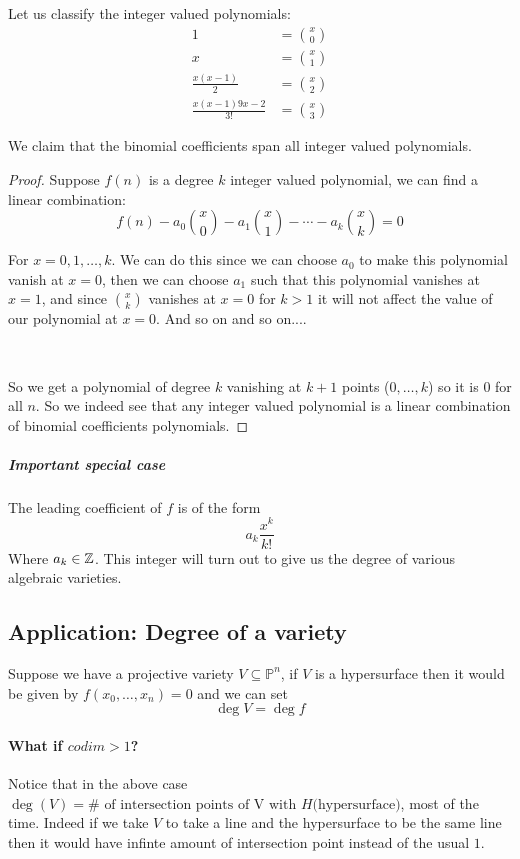 Let us classify the integer valued polynomials:\begin{align*}
    1 &= \binom{x}{0}\\
    x &= \binom{x}{1}\\
    \frac{x(x-1)}{2} &= \binom{x}{2}\\
    \frac{x(x-1)9x-2}{3!} &= \binom{x}{3}
\end{align*}
\begin{proposition}
    We claim that the binomial coefficients span all integer valued polynomials.
\begin{proof}
    Suppose $f(n)$ is a degree $k$ integer valued polynomial, we can find a linear combination:\[
        f(n) - a_0\binom{x}{0} - a_1\binom{x}{1} - \cdots - a_k\binom{x}{k} = 0 
    \]
    
    For $x=0,1,\ldots,k$. We can do this since we can choose $a_0$ to make this polynomial vanish at $x=0$, then we can choose $a_1$ such that this polynomial vanishes at $x=1$, and since $\binom{x}{k}$ vanishes at $x=0$ for $k>1$ it will not affect the value of our polynomial at $x=0$. And so on and so on....
    
    \
    
    So we get a polynomial of degree $k$ vanishing at $k+1$ points ($0,\ldots,k$) so it is $0$ for all $n$. So we indeed see that any integer valued polynomial is a linear combination of binomial coefficients polynomials.
\end{proof}    
\end{proposition}

\subparagraph*{Important special case}
The leading coefficient of $f$ is of the form \[a_k \frac{x^k}{k!}\] Where $a_k\in \mathbb{Z}$. This integer will turn out to give us the degree of various algebraic varieties.


\subsection{Application: Degree of a variety}
Suppose we have a projective variety $V\subseteq \mathbb{P}^n$, if $V$ is a hypersurface then it would be given by $f(x_0,\ldots,x_n) = 0$ and we can set \[\deg V = \deg f\]

\paragraph*{What if $codim>1$?}

Notice that in the above case $\deg(V) = \# \text{ of intersection points of V}\text{ with }H\text{(hypersurface)}$, most of the time. Indeed if we take $V$ to take a line and the hypersurface to be the same line then it would have infinte amount of intersection point instead of the usual $1$.


